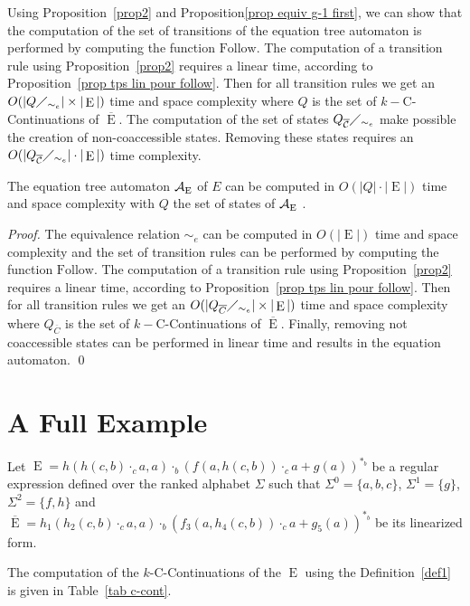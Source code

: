 \documentclass{llncs}
\DeclareMathOperator{\E}{E}
\def\b#1{\overline{#1}}
\begin{document}
Using Proposition~\ref{prop2} and Proposition\ref{prop equiv g-1 first}, we can show that the computation of the set of transitions of the equation tree automaton is performed by computing the function $\mathrm{Follow}$. The computation of a transition rule using Proposition~\ref{prop2} requires a linear time, according to Proposition~\ref{prop tps lin pour follow}. Then for all transition rules we get an $O(|Q\diagup_{\sim_e}| \times |\E|)$ time and space complexity where $Q$ is the set of $k-$C-Continuations of $\b\E$. 
The computation of the set of states $Q_{\b{\cal C}}\diagup_{\sim_e}$ make possible the creation of non-coaccessible states. Removing these states requires an $O(|Q_{\b{\cal C}}\diagup_{\sim_e}|\cdot|\E|)$ time complexity.

\begin{theorem}\label{theo eq tps cons}
 The equation tree automaton ${\cal A}_{\E}$ of  $E$ can be computed in $O(|Q|\cdot|\E|)$ time and space complexity with $Q$ the set of states of ${\cal A}_{\E}$ . 
\end{theorem}
\begin{proof}
  The equivalence relation $\sim_e$ can be computed in $O(|\E|)$ time and space complexity and the set of transition rules can be performed by 
  computing the function $\mathrm{Follow}$. The computation of a transition rule using Proposition~\ref{prop2} requires a linear time, according 
  to Proposition~\ref{prop tps lin pour follow}. Then for all transition rules we get an $O(|Q_{\b C}\diagup_{\sim_e}| \times |\E|)$ time and 
  space complexity where $Q_{\b C}$ is the set of $k-$C-Continuations of $\b\E$. Finally, removing not coaccessible states can be performed in linear time and results in the equation automaton.
  \qed
\end{proof}
\section{A Full Example}\label{sec:exemple}
Let $\E=h(h(c,b)\cdot_c a,a)\cdot_b (f(a,h(c,b))\cdot_c a+g(a))^{*_b}$ be a regular expression defined over the ranked alphabet $\Sigma$ 
such that ${\Sigma}^0=\{a,b,c\}$, $\Sigma^1=\{g\}$, $\Sigma^2=\{f,h\}$ and $\b\E=h_1(h_2(c,b)\cdot_c a,a)\cdot_b (f_3(a,h_4(c,b))\cdot_c a+g_5(a))^{*_b}$ be its linearized form.

The computation of the $k$-C-Continuations of the $\E$ using the Definition~\ref{def1} is given in Table~\ref{tab c-cont}.
\end{document}
